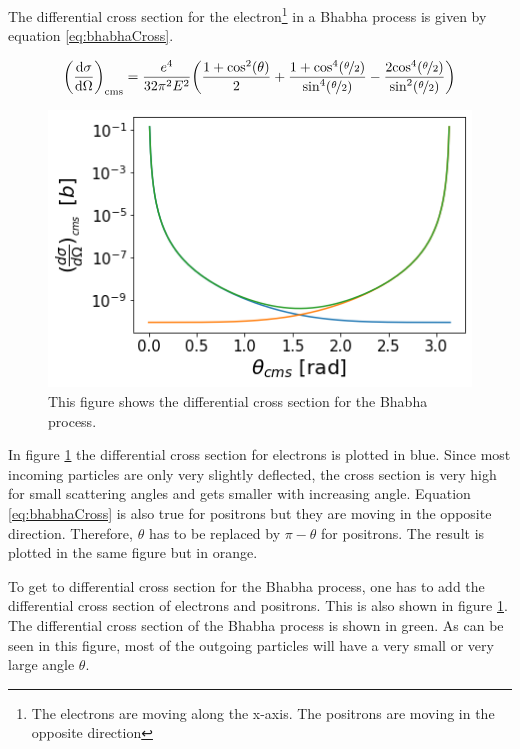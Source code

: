 \documentclass[a4paper,11pt,twosided,final,german,openbib,pdftex,listof=totoc,bibliography=totoc]{scrbook}
\begin{document}
The differential cross section for the electron\footnote{The electrons are moving along the x-axis. The positrons are moving in the opposite direction} in a Bhabha process is given by equation \ref{eq:bhabhaCross}. 

\begin{equation}
	\bigg(\frac{\textrm{d}\sigma}{\textrm{d}\Omega} \bigg)_{\textrm{cms}} = \frac{e^4}{32\pi^2 E^2}
	\bigg(
	\frac{1+\textrm{cos}^2(\theta)}{2} +
 \frac{1+\textrm{cos}^4(\nicefrac{\theta}{2})}{\textrm{sin}^4(\nicefrac{\theta}{2})} - \frac{2\textrm{cos}^4(\nicefrac{\theta}{2})}{\textrm{sin}^2(\nicefrac{\theta}{2})}   \bigg)
 \label{eq:bhabhaCross}
\end{equation}


\begin{figure}[h!]
	\centering
	\includegraphics[width=12cm]{Bilder/finalCross}
	\caption[Differential Cross Section For The Bhabha Process]{This figure shows the differential cross section for the Bhabha process.}
	\label{fig:CrossSectionBoth}
\end{figure}



In figure \ref{fig:CrossSectionBoth} the differential cross section for electrons is plotted in blue. Since most incoming particles are only very slightly deflected, the cross section is very high for small scattering angles and gets smaller with increasing angle. Equation \ref{eq:bhabhaCross} is also true for positrons but they are moving in the opposite direction. Therefore, $\theta$ has to be replaced by $\pi - \theta$ for positrons. The result is plotted in the same figure but in orange.


To get to differential cross section for the Bhabha process, one has to add the differential cross section of electrons and positrons. This is also shown in figure \ref{fig:CrossSectionBoth}. The differential cross section of the Bhabha process is shown in green. As can be seen in this figure, most of the outgoing particles will have a very small or very large angle $\theta$.
\end{document}
